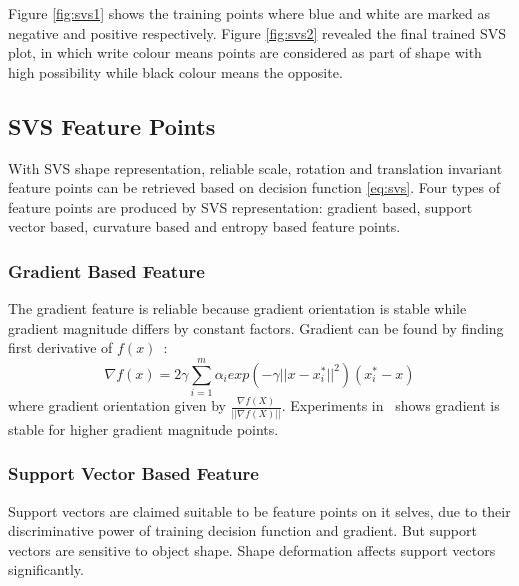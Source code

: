 Figure \ref{fig:svs1} shows the training points where blue and white are marked as negative and positive respectively. Figure \ref{fig:svs2} revealed the final trained SVS plot, in which write colour means points are considered as part of shape with high possibility while black colour means the opposite.

\subsection{SVS Feature Points}
With SVS shape representation, reliable scale, rotation and translation invariant feature points can be retrieved based on decision function \ref{eq:svs}. Four types of feature points are produced by SVS representation: gradient based, support vector based, curvature based and entropy based feature points.

\subsubsection{Gradient Based Feature}
The gradient feature is reliable because gradient orientation is stable while gradient magnitude differs by constant factors. Gradient can be found by finding first derivative of $f(x)$~\cite{Nguyen2013}:
\begin{equation}
\label{eq:svsgrad}
\nabla f(x)=2\gamma\sum^m_{i=1}\alpha_iexp(-\gamma||x-x^*_i||^2)(x^*_i-x)
\end{equation}
where gradient orientation given by $\frac{\nabla f(X)}{||\nabla f(X)||}$. Experiments in~\cite{Nguyen2013} shows gradient is stable for higher gradient magnitude points.

\subsubsection{Support Vector Based Feature}
Support vectors are claimed suitable to be feature points on it selves, due to their discriminative power of training decision function and gradient. But support vectors are sensitive to object shape. Shape deformation affects support vectors significantly.

